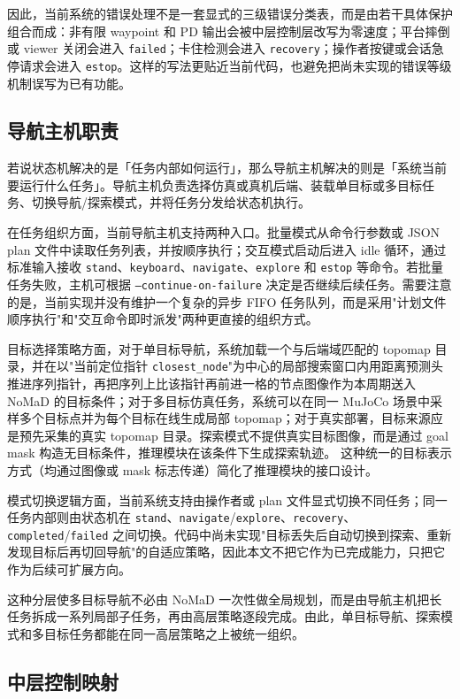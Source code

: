 因此，当前系统的错误处理不是一套显式的三级错误分类表，而是由若干具体保护组合而成：非有限 waypoint 和 PD 输出会被中层控制层改写为零速度；平台摔倒或 viewer 关闭会进入 \texttt{failed}；卡住检测会进入 \texttt{recovery}；操作者按键或会话急停请求会进入 \texttt{estop}。这样的写法更贴近当前代码，也避免把尚未实现的错误等级机制误写为已有功能。

\subsection{导航主机职责}

若说状态机解决的是「任务内部如何运行」，那么导航主机解决的则是「系统当前要运行什么任务」。导航主机负责选择仿真或真机后端、装载单目标或多目标任务、切换导航/探索模式，并将任务分发给状态机执行。

在任务组织方面，当前导航主机支持两种入口。批量模式从命令行参数或 JSON plan 文件中读取任务列表，并按顺序执行；交互模式启动后进入 idle 循环，通过标准输入接收 \texttt{stand}、\texttt{keyboard}、\texttt{navigate}、\texttt{explore} 和 \texttt{estop} 等命令。若批量任务失败，主机可根据 \texttt{--continue-on-failure} 决定是否继续后续任务。需要注意的是，当前实现并没有维护一个复杂的异步 FIFO 任务队列，而是采用"计划文件顺序执行"和"交互命令即时派发"两种更直接的组织方式。

目标选择策略方面，对于单目标导航，系统加载一个与后端域匹配的 topomap 目录，并在以"当前定位指针 \texttt{closest\_node}"为中心的局部搜索窗口内用距离预测头推进序列指针，再把序列上比该指针再前进一格的节点图像作为本周期送入 NoMaD 的目标条件；对于多目标仿真任务，系统可以在同一 MuJoCo 场景中采样多个目标点并为每个目标在线生成局部 topomap；对于真实部署，目标来源应是预先采集的真实 topomap 目录。探索模式不提供真实目标图像，而是通过 goal mask 构造无目标条件，推理模块在该条件下生成探索轨迹。
这种统一的目标表示方式（均通过图像或 mask 标志传递）简化了推理模块的接口设计。

模式切换逻辑方面，当前系统支持由操作者或 plan 文件显式切换不同任务；同一任务内部则由状态机在 \texttt{stand}、\texttt{navigate}/\texttt{explore}、\texttt{recovery}、\texttt{completed}/\texttt{failed} 之间切换。代码中尚未实现"目标丢失后自动切换到探索、重新发现目标后再切回导航"的自适应策略，因此本文不把它作为已完成能力，只把它作为后续可扩展方向。

这种分层使多目标导航不必由 NoMaD 一次性做全局规划，而是由导航主机把长任务拆成一系列局部子任务，再由高层策略逐段完成。由此，单目标导航、探索模式和多目标任务都能在同一高层策略之上被统一组织。

\subsection{中层控制映射}

